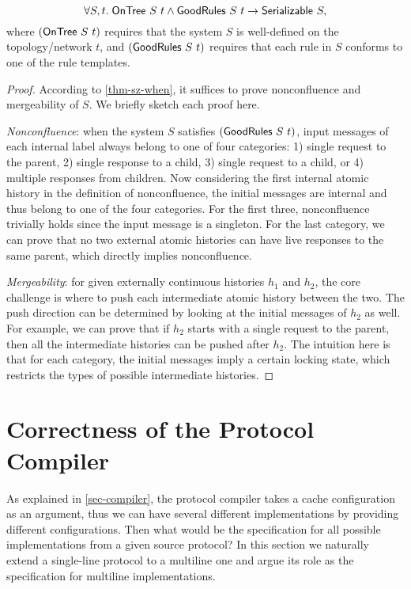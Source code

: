\documentclass[sigplan,10pt,review,anonymous,screen]{acmart}\settopmatter{printfolios=true,printccs=false,printacmref=false}
\begin{document}
\renewcommand*{\proofname}{Proof Sketch}
\begin{theorem}
  \begin{displaymath}
    \forall S, t.\; \mathsf{OnTree}\ S\ t \land \mathsf{GoodRules}\ S\ t \to \mathsf{Serializable}\ S,
  \end{displaymath}
  where $(\mathsf{OnTree}\ S\ t)$ requires that the system $S$ is well-defined on the
  topology/network $t$, and $(\mathsf{GoodRules}\ S\ t)$ requires that each rule in $S$
  conforms to one of the rule templates.
\end{theorem}
\begin{proof}
  According to \autoref{thm-sz-when}, it suffices to prove nonconfluence and mergeability of $S$. We briefly sketch each proof here.

  \emph{Nonconfluence}: when the system $S$ satisfies $(\mathsf{GoodRules}\ S\ t)$, input messages of each internal label always belong to one of four categories:
  1) single request to the parent, 2) single response to a child, 3) single request to a child, or 4) multiple responses from children.
  Now considering the first internal atomic history in the definition of nonconfluence, the initial messages are internal and thus belong to one of the four categories.
  For the first three, nonconfluence trivially holds since the input message is a singleton.
  For the last category, we can prove that no two external atomic histories can have live responses to the same parent, which directly implies nonconfluence.

  \emph{Mergeability}: for given externally continuous histories $h_1$ and $h_2$, the core challenge is where to push each intermediate atomic history between the two.
  The push direction can be determined by looking at the initial messages of $h_2$ as well.
  For example, we can prove that if $h_2$ starts with a single request to the parent, then all the intermediate histories can be pushed after $h_2$.
  The intuition here is that for each category, the initial messages imply a certain locking state, which restricts the types of possible intermediate histories.
\end{proof}
\renewcommand*{\proofname}{Proof}

\section{Correctness of the Protocol Compiler}
\label{sec-appx-compiler-proof}

As explained in \autoref{sec-compiler}, the protocol compiler takes a cache configuration as an argument, thus we can have several different implementations by providing different configurations.
Then what would be the specification for all possible implementations from a given source protocol?
In this section we naturally extend a single-line \hemiola{} protocol to a multiline one and argue its role as the specification for multiline implementations.
\end{document}
